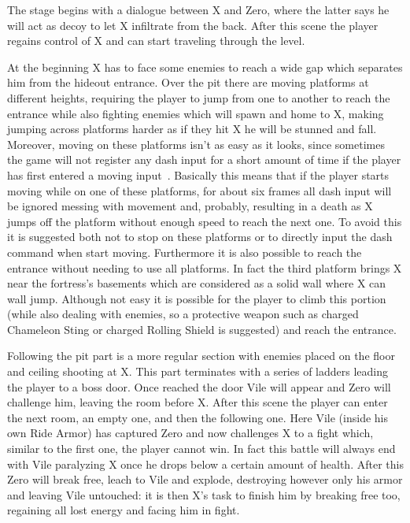 The stage begins with a dialogue between X and Zero, where the latter says he will act as decoy to let X infiltrate from the back. After this scene the player regains control of X and can start traveling through the level. 

At the beginning X has to face some enemies to reach a wide gap which separates him from the hideout entrance. Over the pit there are moving platforms at different heights, requiring the player to jump from one to another to reach the entrance while also fighting enemies which will spawn and home to X, making jumping across platforms harder as if they hit X he will be stunned and fall. Moreover, moving on these platforms isn't as easy as it looks, since sometimes the game will not register any dash input for a short amount of time if the player has first entered a moving input~\cite{RTA_wiki:X1}. Basically this means that if the player starts moving while on one of these platforms, for about six frames all dash input will be ignored messing with movement and, probably, resulting in a death as X jumps off the platform without enough speed to reach the next one. To avoid this it is suggested both not to stop on these platforms or to directly input the dash command when start moving. Furthermore it is also possible to reach the entrance without needing to use all platforms. In fact the third platform brings X near the fortress's basements which are considered as a solid wall where X can wall jump. Although not easy it is possible for the player to climb this portion (while also dealing with enemies, so a protective weapon such as charged Chameleon Sting or charged Rolling Shield is suggested) and reach the entrance.

Following the pit part is a more regular section with enemies placed on the floor and ceiling shooting at X. This part terminates with a series of ladders leading the player to a boss door. Once reached the door Vile will appear and Zero will challenge him, leaving the room before X. After this scene the player can enter the next room, an empty one, and then the following one. Here Vile (inside his own Ride Armor) has captured Zero and now challenges X to a fight which, similar to the first one, the player cannot win. In fact this battle will always end with Vile paralyzing X once he drops below a certain amount of health. After this Zero will break free, leach to Vile and explode, destroying however only his armor and leaving Vile untouched: it is then X's task to finish him by breaking free too, regaining all lost energy and facing him in fight.

